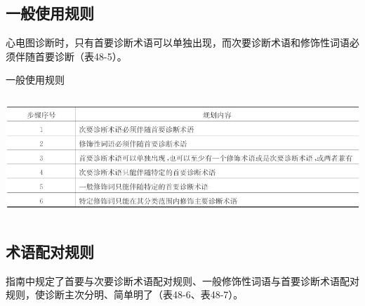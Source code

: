 \protect\hypertarget{text00057.htmlux5cux23subid707}{}{}

\subsection{一般使用规则}

心电图诊断时，只有首要诊断术语可以单独出现，而次要诊断术语和修饰性词语必须伴随首要诊断（表48-5）。

\begin{table}[htbp]
\centering
\caption{一般使用规则}
\label{tab48-5}
\includegraphics[width=6.23958in,height=1.79167in]{./images/Image00754.jpg}
\end{table}

\protect\hypertarget{text00057.htmlux5cux23subid708}{}{}

\subsection{术语配对规则}

指南中规定了首要与次要诊断术语配对规则、一般修饰性词语与首要诊断术语配对规则，使诊断主次分明、简单明了（表48-6、表48-7）。

